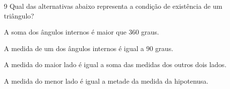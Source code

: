 

\num{9}  Qual das alternativas abaixo representa a condição de existência de
um triângulo?

\begin{escolha}
\item A soma dos ângulos internos é maior que $360$ graus. 
\item A medida de um
dos ângulos internos é igual a $90$ graus. 
\item A medida do maior lado é
igual a soma das medidas dos outros dois lados. 
\item A medida do menor
lado é igual a metade da medida da hipotenusa.
\end{escolha}



